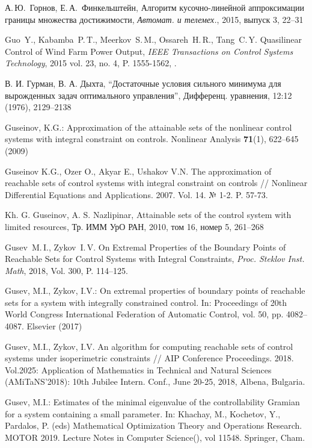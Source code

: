 \documentclass[../main.tex]{subfiles}
\begin{document}
\begin{thebibliography}{99}
    А.\,Ю.~Горнов, Е.\,А.~Финкельштейн, Алгоритм кусочно-линейной аппроксимации границы множества достижимости, {\it Автомат. и телемех.}, 2015, выпуск 3, 22–31
   

Guo~Y., Kabamba~P.\,T., Meerkov~S.\,M.,  Ossareh~H.\,R., Tang~C.\,Y. Quasilinear Control of Wind Farm Power Output, \emph{IEEE Transactions on Control Systems Technology}, 2015 vol. 23, no. 4, P. 1555-1562,  .

В. И. Гурман, В. А. Дыхта, “Достаточные условия сильного минимума для вырожденных задач оптимального управления”, Дифференц. уравнения, 12:12 (1976), 2129–2138

Guseinov, K.G.: Approximation of the attainable sets of the nonlinear control systems with integral constraint on controls. Nonlinear Analysis \textbf{71}(1), 622--645 (2009) 

Guseinov K.G., Ozer O., Akyar E., Ushakov V.N. The approximation of reachable sets of control systems with integral constraint on controls // Nonlinear Differential Equations and Applications. 2007. Vol. 14. № 1-2. P. 57-73.

Kh. G. Guseinov, A. S. Nazlipinar, Attainable sets of the control system with limited resources, Тр. ИММ УрО РАН, 2010, том 16, номер 5, 261–268


Gusev~M.\,I., Zykov~I.\,V. On Extremal Properties of the Boundary Points of Reachable Sets for Control Systems with Integral Constraints, \emph{Proc. Steklov Inst. Math}, 2018, Vol. 300, P. 114--125. 

Gusev, M.I., Zykov, I.V.: On extremal properties of boundary points of reachable sets for a system with integrally constrained control. In: Proceedings of 20th World Congress International Federation of Automatic Control, vol. 50, pp. 4082--4087. Elsevier (2017) 

Gusev, M.I., Zykov, I.V.
An algorithm for computing reachable sets of control systems under isoperimetric constraints // AIP Conference Proceedings. 
2018. 
Vol.2025: Application of Mathematics in Technical and Natural Sciences 
(AMiTaNS'2018): 10th Jubilee Intern. Conf.,
June 20-25, 2018, Albena, Bulgaria.

Gusev, M.I.: Estimates of the minimal eigenvalue of the controllability Gramian for a system containing a small parameter.  In: 
Khachay, M., Kochetov, Y., Pardalos, P. (eds) Mathematical Optimization Theory and Operations Research. MOTOR 
2019. Lecture Notes in Computer Science(), vol 11548. Springer, Cham. 



\end{thebibliography}
\end{document}
